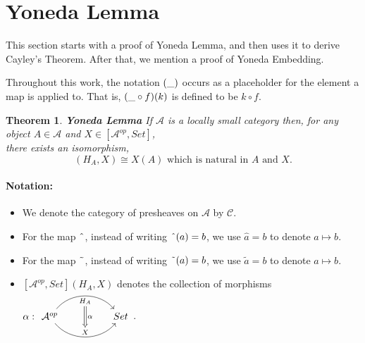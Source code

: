 \documentclass[a4paper]{article}
\newtheorem{theorem}{Theorem}[section]
\theoremstyle{definition}
\begin{document}
\section{Yoneda Lemma} %
This section starts with a proof of Yoneda Lemma, and then uses it to derive Cayley's Theorem.
After that, we mention a proof of Yoneda Embedding.

Throughout this work, the notation $(\string _)$ occurs as a placeholder for the element a map is applied to.
		That is, $(\string _ \circ f)(k)$ is defined to be $k \circ f$.
		\begin{theorem}{\textbf{Yoneda Lemma}} %
			\setcounter{equation}{0}
			If $\mathcal{A} $ is a locally small category then, for any object $A \in \mathcal{A} $
			and $X \in [ \mathcal{A}^{op},Set]$,\\ there exists an isomorphism,
			\begin{equation} [ \mathcal{A} ^{op},Set ](H_A,X)\cong X(A) \text{ which is natural in } A \text{ and } X.\end{equation}
		\end{theorem}
		\paragraph{Notation:} \begin{itemize}
			\item We denote the category of presheaves on $\mathcal{A}$ by $\mathcal{C}$.
			\item For the map $\string ^$, instead of writing $\string ^ (a)=b$,
				we use $\hat{a} = b$ to denote $a \mapsto b$.

			\item For the map $\string ~$, instead of writing $\string ~ (a)=b$,
				we use $\tilde{a} = b$ to denote $a \mapsto b$.
			\item $[ \mathcal{A}^{op},Set](	H_A,X) $ denotes the collection of morphisms $\alpha: \begin{tikzcd}[row sep=large, column sep=huge]
					\mathcal{A} ^{op} \arrow[r,bend left=50, "H_A"{name=U, below}]
					\arrow[r, bend right = 50, "X"{name=D, above}]
					& Set
					\arrow[Rightarrow, from=U , to=D, "\alpha"]
				\end{tikzcd}$.
		\end{itemize}
\end{document}
